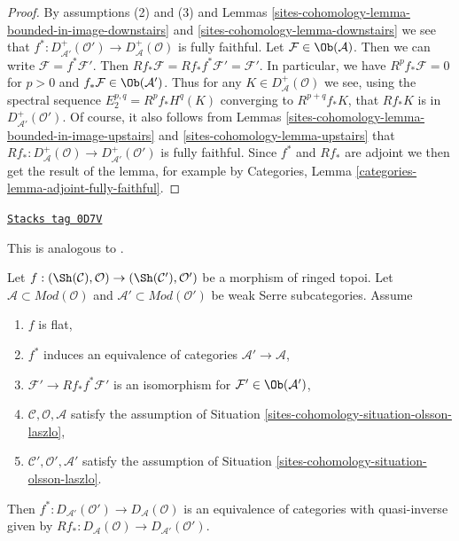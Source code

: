 \begin{proof}
By assumptions (2) and (3) and
Lemmas \ref{sites-cohomology-lemma-bounded-in-image-downstairs} and \ref{sites-cohomology-lemma-downstairs}
we see that
$f^* : D_{\mathcal{A}'}^+(\mathcal{O}') \to D_\mathcal{A}^+(\mathcal{O})$
is fully faithful.
Let $\mathcal{F} \in \Ob(\mathcal{A})$. Then we can write
$\mathcal{F} = f^*\mathcal{F}'$. Then
$Rf_*\mathcal{F} = Rf_* f^*\mathcal{F}' = \mathcal{F}'$.
In particular, we have $R^pf_*\mathcal{F} = 0$ for $p > 0$
and $f_*\mathcal{F} \in \Ob(\mathcal{A}')$.
Thus for any $K \in D^+_\mathcal{A}(\mathcal{O})$ we see,
using the spectral sequence $E_2^{p, q} = R^pf_*H^q(K)$
converging to $R^{p + q}f_*K$,
that $Rf_*K$ is in $D^+_{\mathcal{A}'}(\mathcal{O}')$.
Of course, it also follows from
Lemmas \ref{sites-cohomology-lemma-bounded-in-image-upstairs} and \ref{sites-cohomology-lemma-upstairs}
that $Rf_* : D_\mathcal{A}^+(\mathcal{O}) \to D_{\mathcal{A}'}^+(\mathcal{O}')$
is fully faithful. Since $f^*$ and $Rf_*$ are adjoint
we then get the result of the lemma, for example by
Categories, Lemma \ref{categories-lemma-adjoint-fully-faithful}.
\end{proof}

\begin{lemma}
\label{sites-cohomology-lemma-equivalence-unbounded-one}
\href{https://stacks.math.columbia.edu/tag/0D7V}{\texttt{Stacks tag 0D7V}}

\begin{reference}
This is analogous to \cite[Theorem 2.2.3]{six-I}.
\end{reference}
Let $f : (\Sh(\mathcal{C}), \mathcal{O}) \to (\Sh(\mathcal{C}'), \mathcal{O}')$
be a morphism of ringed topoi.
Let $\mathcal{A} \subset \textit{Mod}(\mathcal{O})$
and $\mathcal{A}' \subset \textit{Mod}(\mathcal{O}')$
be weak Serre subcategories. Assume
\begin{enumerate}
\item $f$ is flat,
\item $f^*$ induces an equivalence of categories
$\mathcal{A}' \to \mathcal{A}$,
\item $\mathcal{F}' \to Rf_*f^*\mathcal{F}'$ is an isomorphism
for $\mathcal{F}' \in \Ob(\mathcal{A}')$,
\item $\mathcal{C}, \mathcal{O}, \mathcal{A}$ satisfy the
assumption of Situation \ref{sites-cohomology-situation-olsson-laszlo},
\item $\mathcal{C}', \mathcal{O}', \mathcal{A}'$ satisfy the
assumption of Situation \ref{sites-cohomology-situation-olsson-laszlo}.
\end{enumerate}
Then $f^* : D_{\mathcal{A}'}(\mathcal{O}') \to D_\mathcal{A}(\mathcal{O})$
is an equivalence of categories with quasi-inverse given by
$Rf_* : D_\mathcal{A}(\mathcal{O}) \to D_{\mathcal{A}'}(\mathcal{O}')$.
\end{lemma}

